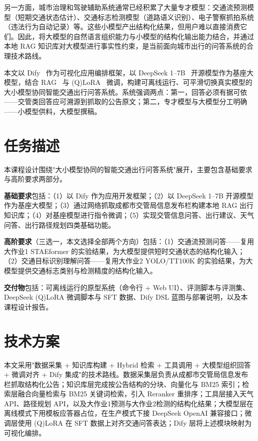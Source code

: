 \documentclass[bwprint]{report}
\begin{document}
另一方面，城市治理和驾驶辅助系统通常已经积累了大量专才模型：交通流预测模型（短期交通状态估计）、交通标志检测模型（道路语义识别）、电子警察抓拍系统（违法行为自动记录）等。这些小模型产出结构化结果，但用户难以直接消费它们。因此，将大模型的自然语言组织能力与小模型的结构化输出能力结合，并通过本地 RAG 知识库对大模型进行事实性约束，是当前面向城市出行的问答系统的合理技术路线。

本文以 Dify~\cite{dify} 作为可视化应用编排框架，以 DeepSeek 1--7B~\cite{deepseek_llm} 开源模型作为基座大模型，结合 RAG~\cite{rag} 与 (Q)LoRA~\cite{lora,qlora} 微调，构建可离线运行、可平滑切换真实模型的大小模型协同智能交通出行问答系统。系统强调两点：第一，回答必须有据可依——交管类回答应可溯源到抓取的公告原文；第二，专才模型与大模型分工明确——小模型供料，大模型撰稿。

\section{任务描述}
本课程设计围绕"大小模型协同的智能交通出行问答系统"展开，主要包含基础要求与高阶要求两部分。

\textbf{基础要求}包括：（1）以 Dify 作为应用开发框架；（2）以 DeepSeek 1--7B 开源模型作为基座大模型；（3）通过网络抓取成都市交管局信息发布栏构建本地 RAG 出行知识库；（4）对基座模型进行指令微调；（5）实现交管信息问答、出行建议、天气问答、出行路径规划四类基础功能。

\textbf{高阶要求}（三选一，本文选择全部两个方向）包括：（1）交通流预测问答——复用大作业1 STAEformer 的实验结果，为大模型提供短时交通状态的结构化输入；（2）交通目标识别理解问答——复用大作业2 YOLO/TT100K 的实验结果，为大模型提供交通标志类别与检测精度的结构化输入。

\textbf{交付物}包括：可离线运行的原型系统（命令行 + Web UI）、评测脚本与评测集、DeepSeek (Q)LoRA 微调脚本与 SFT 数据、Dify DSL 蓝图与部署说明，以及本课程设计报告。

\section{技术方案}
本文采用"数据采集 + 知识库构建 + Hybrid 检索 + 工具调用 + 大模型组织回答 + 微调对齐 + Dify 集成"的技术路线。数据采集层负责从成都市交管局信息发布栏抓取结构化公告；知识库层完成按公告结构的分块、向量化与 BM25 索引；检索层融合向量检索与 BM25 关键词检索，引入 Reranker 重排序；工具层接入天气 API、路径规划 API，以及大作业1预测与大作业2检测的结构化结果；大模型层在离线模式下用模板应答器占位，在生产模式下接 DeepSeek OpenAI 兼容接口；微调层使用 (Q)LoRA 在 SFT 数据上对齐交通问答表达；Dify 层将上述模块映射为可视化编排。
\end{document}
